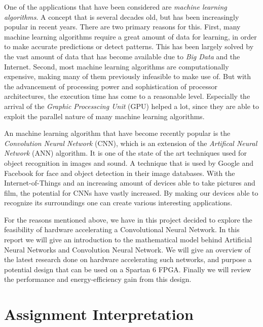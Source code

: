 One of the applications that have been considered are \textit{machine learning algorithms}. A concept that is several decades old, but has been increasingly popular in recent years. There are two primary reasons for this. First, many machine learning algorithms require a great amount of data for learning, in order to make accurate predictions or detect patterns. This has been largely solved by the vast amount of data that has become available due to \textit{Big Data} and the Internet. Second, most machine learning algorithms are computationally expensive, making many of them previously infeasible to make use of. But with the advancement of processing power and sophistication of processor architectures, the execution time has come to a reasonable level. Especially the arrival of the \textit{Graphic Processcing Unit} (GPU) helped a lot, since they are able to exploit the parallel nature of many machine learning algorithms. 

An machine learning algorithm that have become recently popular is the \textit{Convolution Neural Network} (CNN), which is an extension of the \textit{Artifical Neural Network} (ANN) algorithm. It is one of the state of the art techniques used for object recognition in images and sound. A technique that is used by Google and Facebook for face and object detection in their image databases. With the Internet-of-Things and an increasing amount of devices able to take pictures and film, the potential for CNNs have vastly increased. By making our devices able to recognize its surroundings one can create various interesting applications.

For the reasons mentioned above, we have in this project decided to explore the feasibility of hardware accelerating a Convolutional Neural Network. In this report we will give an introduction to the mathematical model behind Artificial Neural Networks and Convolution Neural Network. We will give an overview of the latest research done on hardware accelerating such networks, and purpose a potential design that can be used on a Spartan 6 FPGA. Finally we will review the performance and energy-efficiency gain from this design.

\section{Assignment Interpretation}


